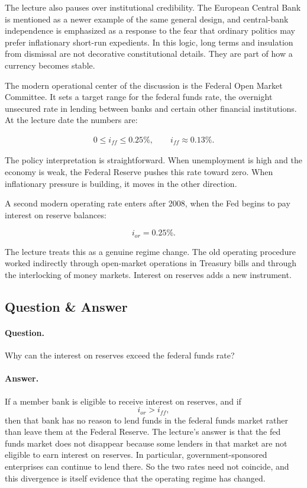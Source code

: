 The lecture also pauses over institutional credibility. The European Central Bank is mentioned as a newer example of the same general design, and central-bank independence is emphasized as a response to the fear that ordinary politics may prefer inflationary short-run expedients. In this logic, long terms and insulation from dismissal are not decorative constitutional details. They are part of how a currency becomes stable.

The modern operational center of the discussion is the Federal Open Market Committee. It sets a target range for the federal funds rate, the overnight unsecured rate in lending between banks and certain other financial institutions. At the lecture date the numbers are:

\begin{align}
0 \le i_{ff} \le 0.25\%, \qquad i_{ff} \approx 0.13\%.
\end{align}

The policy interpretation is straightforward. When unemployment is high and the economy is weak, the Federal Reserve pushes this rate toward zero. When inflationary pressure is building, it moves in the other direction.

A second modern operating rate enters after 2008, when the Fed begins to pay interest on reserve balances:

\begin{equation}
i_{or} = 0.25\%.
\end{equation}

The lecture treats this as a genuine regime change. The old operating procedure worked indirectly through open-market operations in Treasury bills and through the interlocking of money markets. Interest on reserves adds a new instrument.

\subsection{Question \& Answer}

\paragraph{Question.} Why can the interest on reserves exceed the federal funds rate?

\paragraph{Answer.} If a member bank is eligible to receive interest on reserves, and if
\[
i_{or} > i_{ff},
\]
then that bank has no reason to lend funds in the federal funds market rather than leave them at the Federal Reserve. The lecture's answer is that the fed funds market does not disappear because some lenders in that market are not eligible to earn interest on reserves. In particular, government-sponsored enterprises can continue to lend there. So the two rates need not coincide, and this divergence is itself evidence that the operating regime has changed.

